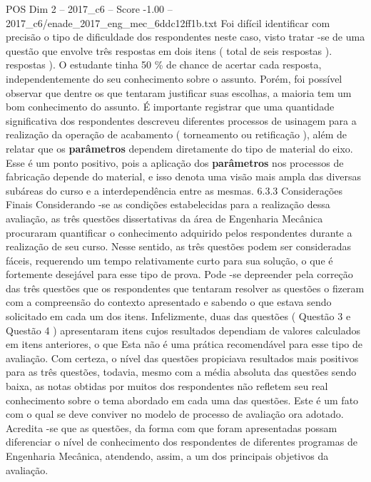 \begin{textsample}{POS Dim 2 – 2017\_c6 – Score -1.00 – 2017\_c6/enade\_2017\_eng\_mec\_6ddc12ff1b.txt}
Foi difícil identificar com precisão o tipo de dificuldade dos respondentes neste caso, visto tratar -se de uma questão que envolve três respostas em dois itens ( total de seis respostas ). respostas ).
O estudante tinha 50 \% de chance de acertar cada resposta, independentemente do seu conhecimento sobre o assunto.
Porém, foi possível observar que dentre os que tentaram justificar suas escolhas, a maioria tem um bom conhecimento do assunto.
É importante registrar que uma quantidade significativa dos respondentes descreveu diferentes processos de usinagem para a realização da operação de acabamento ( torneamento ou retificação ), além de relatar que os \textbf{parâmetros} dependem diretamente do tipo de material do eixo.
Esse é um ponto positivo, pois a aplicação dos \textbf{parâmetros} nos processos de fabricação depende do material, e isso denota uma visão mais ampla das diversas subáreas do curso e a interdependência entre as mesmas. 6.3.3 Considerações Finais Considerando -se as condições estabelecidas para a realização dessa avaliação, as três questões dissertativas da área de Engenharia Mecânica procuraram quantificar o conhecimento adquirido pelos respondentes durante a realização de seu curso.
Nesse sentido, as três questões podem ser consideradas fáceis, requerendo um tempo relativamente curto para sua solução, o que é fortemente desejável para esse tipo de prova.
Pode -se depreender pela correção das três questões que os respondentes que tentaram resolver as questões o fizeram com a compreensão do contexto apresentado e sabendo o que estava sendo solicitado em cada um dos itens.
Infelizmente, duas das questões ( Questão 3 e Questão 4 ) apresentaram itens cujos resultados dependiam de valores calculados em itens anteriores, o que Esta não é uma prática recomendável para esse tipo de avaliação.
Com certeza, o nível das questões propiciava resultados mais positivos para as três questões, todavia, mesmo com a média absoluta das questões sendo baixa, as notas obtidas por muitos dos respondentes não refletem seu real conhecimento sobre o tema abordado em cada uma das questões.
Este é um fato com o qual se deve conviver no modelo de processo de avaliação ora adotado.
Acredita -se que as questões, da forma com que foram apresentadas possam diferenciar o nível de conhecimento dos respondentes de diferentes programas de Engenharia Mecânica, atendendo, assim, a um dos principais objetivos da avaliação.

\end{textsample}
